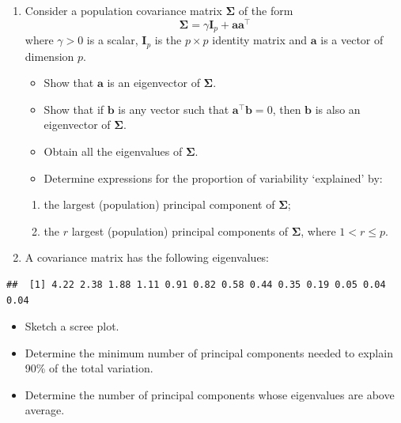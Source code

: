 \documentclass[]{book}
\providecommand{\tightlist}{%
  \setlength{\itemsep}{0pt}\setlength{\parskip}{0pt}}
\theoremstyle{definition}
\theoremstyle{definition}
\theoremstyle{definition}
\theoremstyle{remark}
\begin{document}
\begin{enumerate}
\def\labelenumi{\arabic{enumi}.}
\setcounter{enumi}{1}
\tightlist
\item
  Consider a population covariance matrix \(\boldsymbol{\Sigma}\) of the form
  \[\boldsymbol{\Sigma}=\gamma \mathbf I_p + \mathbf a\mathbf a^\top\]
  where \(\gamma>0\) is a scalar, \(\mathbf I_p\) is the \(p \times p\) identity matrix and \(\mathbf a\) is a vector of dimension \(p\).

  \begin{itemize}
  \tightlist
  \item
    Show that \(\mathbf a\) is an eigenvector of \(\boldsymbol{\Sigma}\).
  \item
    Show that if \(\mathbf b\) is any vector such that \(\mathbf a^\top \mathbf b=0\), then \(\mathbf b\) is also an eigenvector of \(\boldsymbol{\Sigma}\).
  \item
    Obtain all the eigenvalues of \(\boldsymbol{\Sigma}\).
  \item
    Determine expressions for the proportion of variability `explained' by:
  \end{itemize}

  \begin{enumerate}
  \def\labelenumii{\roman{enumii}.}
  \tightlist
  \item
    the largest (population) principal component of \(\boldsymbol{\Sigma}\);
  \item
    the \(r\) largest (population) principal components of \(\boldsymbol{\Sigma}\), where \(1 < r \leq p\).
  \end{enumerate}
\item
  A covariance matrix has the following eigenvalues:
\end{enumerate}

\begin{verbatim}
##  [1] 4.22 2.38 1.88 1.11 0.91 0.82 0.58 0.44 0.35 0.19 0.05 0.04 0.04
\end{verbatim}

\begin{itemize}
\tightlist
\item
  Sketch a scree plot.
\item
  Determine the minimum number of principal components needed to explain 90\% of the total variation.
\item
  Determine the number of principal components whose eigenvalues are above average.
\end{itemize}
\end{document}
